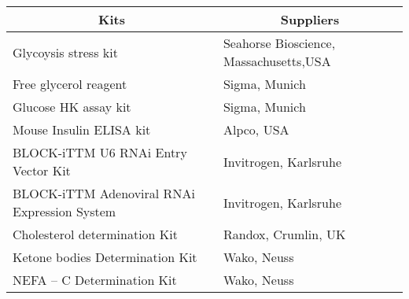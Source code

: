 \setlongtables\begin{longtable}{ll}\hline\hline
\multicolumn{1}{c}{Kits}&\multicolumn{1}{c}{Suppliers}\tabularnewline
\hline
\endhead
\hline
\endfoot
Glycoysis stress kit&Seahorse Bioscience, Massachusetts,USA\tabularnewline
Free glycerol reagent&Sigma, Munich\tabularnewline
Glucose HK assay kit&Sigma, Munich\tabularnewline
Mouse Insulin ELISA kit&Alpco, USA\tabularnewline
BLOCK-iTTM U6 RNAi Entry Vector Kit &Invitrogen, Karlsruhe \tabularnewline
BLOCK-iTTM Adenoviral RNAi Expression System &Invitrogen, Karlsruhe \tabularnewline
Cholesterol determination Kit&Randox, Crumlin, UK \tabularnewline
Ketone bodies Determination Kit &Wako, Neuss\tabularnewline
NEFA – C Determination Kit&Wako, Neuss\tabularnewline
\hline
\end{longtable}
